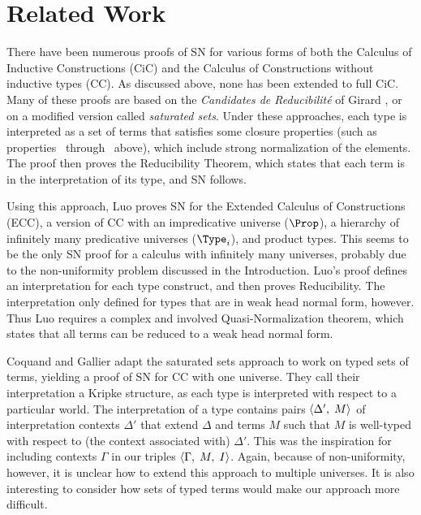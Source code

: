 \documentclass{article}
\begin{document}
\section{Related Work}
\label{sec:related-work}

There have been numerous proofs of SN for various forms of both the
Calculus of Inductive Constructions (CiC) and the Calculus of
Constructions without inductive types (CC). As discussed above, none
has been extended to full CiC. Many of these proofs are based on the
\emph{Candidates de Reducibilit\'{e}} of Girard
\cite{girard-proofs-types}, or on a modified version called
\emph{saturated sets}.  Under these approaches, each type is
interpreted as a set of terms that satisfies some closure properties
(such as properties \CRone\ through \CRfour\ above), which include
strong normalization of the elements. The proof then proves the
Reducibility Theorem, which states that each term is in the
interpretation of its type, and SN follows.

Using this approach, Luo \cite{luo90} proves SN for the Extended
Calculus of Constructions (ECC), a version of CC with an impredicative
universe ($\Prop$), a hierarchy of infinitely many predicative
universes ($\Type_i$), and product types. This seems to be the
only SN proof for a calculus with infinitely many universes, probably
due to the non-uniformity problem discussed in the Introduction.
Luo's proof defines an interpretation for each type construct, and
then proves Reducibility. The interpretation only defined for
types that are in weak head normal form, however. Thus Luo
requires a complex and involved Quasi-Normalization theorem, which
states that all terms can be reduced to a weak head normal form.

Coquand and Gallier \cite{coquand90} adapt the saturated sets approach
to work on typed sets of terms, yielding a proof of SN for CC with one
universe. They call their interpretation a Kripke structure, as each
type is interpreted with respect to a particular world. The
interpretation of a type contains pairs $\langle \Delta' ,\; M\rangle$ of
interpretation contexts $\Delta'$ that extend $\Delta$ and terms $M$
such that $M$ is well-typed with respect to (the context associated
with) $\Delta'$. This was the inspiration for including contexts
$\Gamma$ in our triples $\langle \Gamma ,\; M, \; I\rangle$.  Again, because of
non-uniformity, however, it is unclear how to extend this approach to
multiple universes. It is also interesting to consider how sets of
typed terms would make our approach more difficult.
\end{document}
